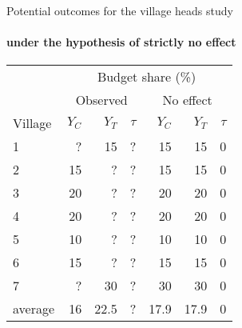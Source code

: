 
\begin{frame}{Potential outcomes for the village heads study}
\framesubtitle{under     the hypothesis of     strictly no effect}

\begin{tabular}{l|rrr|rrr} \hline
& \multicolumn{6}{c}{Budget share (\%)} \\
& \multicolumn{3}{c}{Observed} & \multicolumn{3}{c}{No effect} \\
Village &$Y_{C}$& $Y_{T}$& $\tau$  &$Y_{C}$& $Y_{T}$& $\tau$ \\ \hline
1&  ? & 15 & ? & 15 & 15 & 0 \\
2& 15 & ? &   ?  & 15 & 15 & 0 \\ 
3& 20 & ? &   ?  & 20 & 20 & 0 \\
4& 20 & ? &   ?  & 20 & 20 & 0 \\
5& 10 & ? &   ?  & 10 & 10 & 0 \\
6& 15 & ? &   ?  & 15 & 15 & 0 \\
7& ?   & 30&? & 30 &30 & 0 \\ \hline
average & 16 & 22.5 & ? & 17.9 & 17.9 & 0 \\ \hline
\end{tabular}
\end{frame}

